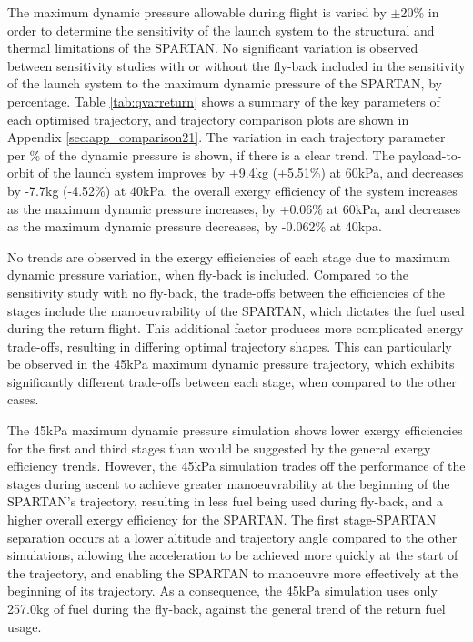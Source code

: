 The maximum dynamic pressure allowable during flight is varied by $\pm$20\% in order to determine the sensitivity of the launch system to the structural and thermal limitations of the SPARTAN. 
No significant variation is observed between sensitivity studies with or without the fly-back included in the sensitivity of the launch system to the maximum dynamic pressure of the SPARTAN, by percentage. 
Table \ref{tab:qvarreturn} shows a summary of the key parameters of each optimised trajectory, and trajectory comparison plots are shown in Appendix \ref{sec:app_comparison21}. The variation in each trajectory parameter per \% of the dynamic pressure is shown, if there is a clear trend. The payload-to-orbit of the launch system improves by +9.4kg (+5.51\%) at 60kPa, and decreases by -7.7kg (-4.52\%) at 40kPa.
the overall exergy efficiency of the system increases as the maximum dynamic pressure increases, by +0.06\% at 60kPa, and decreases as the maximum dynamic pressure decreases, by -0.062\% at 40kpa. 

No trends are observed in the exergy efficiencies of each stage due to maximum dynamic pressure variation, when fly-back is included. Compared to the sensitivity study with no fly-back, the trade-offs between the efficiencies of the stages include the manoeuvrability of the SPARTAN, which dictates the fuel used during the return flight. This additional factor produces more complicated energy trade-offs, resulting in differing optimal trajectory shapes. This can particularly be observed in the 45kPa maximum dynamic pressure trajectory, which exhibits significantly different trade-offs between each stage, when compared to the other cases. 

 The 45kPa maximum dynamic pressure simulation shows lower exergy efficiencies for the first and third stages than would be suggested by the general exergy efficiency trends. 
 However, the 45kPa simulation trades off the performance of the stages during ascent to achieve greater manoeuvrability at the beginning of the SPARTAN's trajectory, resulting in less fuel being used during fly-back, and a higher overall exergy efficiency for the SPARTAN. The first stage-SPARTAN separation occurs at a lower altitude and trajectory angle compared to the other simulations, allowing the acceleration to be achieved more quickly at the start of the trajectory, and enabling the SPARTAN to manoeuvre more effectively at the beginning of its trajectory. 
 As a consequence, the 45kPa simulation uses only 257.0kg of fuel during the fly-back, against the general trend of the return fuel usage. 

